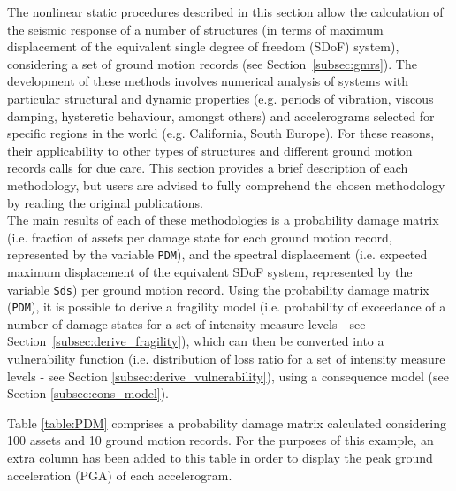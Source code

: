 The nonlinear static procedures described in this section allow the calculation of the seismic response of a number of structures (in terms of maximum displacement of the equivalent single degree of freedom (SDoF) system), considering a set of ground motion records (see Section~\ref{subsec:gmrs}). The development of these methods involves numerical analysis of systems with particular structural and dynamic properties (e.g. periods of vibration, viscous damping, hysteretic behaviour, amongst others) and accelerograms selected for specific regions in the world (e.g. California, South Europe). For these reasons, their applicability to other types of structures and different ground motion records calls for due care. This section provides a brief description of each methodology, but users are advised to fully comprehend the chosen methodology by reading the original publications. \\

The main results of each of these methodologies is a probability damage matrix (i.e. fraction of assets per damage state for each ground motion record, represented by the variable \verb=PDM=), and the spectral displacement (i.e. expected maximum displacement of the equivalent SDoF system, represented by the variable \verb=Sds=) per ground motion record. Using the probability damage matrix (\verb=PDM=), it is possible to derive a fragility model (i.e. probability of exceedance of a number of damage states for a set of intensity measure levels - see Section~\ref{subsec:derive_fragility}), which can then be converted into a vulnerability function (i.e. distribution of loss ratio for a set of intensity measure levels - see Section \ref{subsec:derive_vulnerability}), using a consequence model (see Section \ref{subsec:cons_model}).

Table \ref{table:PDM} comprises a probability damage matrix calculated considering 100 assets and 10 ground motion records. For the purposes of this example, an extra column has been added to this table in order to display the peak ground acceleration (PGA) of each accelerogram.

